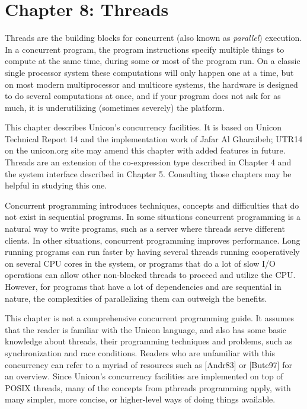 \clearpage\section{Chapter 8: Threads}

Threads are the building blocks for concurrent (also known as
{\em parallel\/}) execution. In a concurrent program,  the program
instructions specify multiple things to compute at the same time,
during some or most of the program run.  On a classic single processor
system these computations will only happen one at a time, but on most
modern multiprocessor and multicore systems, the hardware is designed
to do several computations at once, and if your program does not ask
for as much, it is underutilizing (sometimes severely) the platform.

This chapter describes Unicon's concurrency facilities. It is based
on Unicon Technical Report 14 and the implementation work of Jafar
Al Gharaibeh; UTR14 on the unicon.org site may amend this chapter
with added features in future.
Threads are an extension of the co-expression type described in
Chapter 4 and the system interface described in Chapter 5.
Consulting those chapters may be helpful in studying this one.

Concurrent programming introduces techniques, concepts and difficulties
that do not exist in sequential programs. In some situations concurrent
programming is a natural way to write programs, such as a server where
threads serve different clients. In other situations, concurrent
programming improves performance. Long running programs can run faster
by having several threads running cooperatively on several CPU cores in
the system, or programs that do a lot of slow I/O operations can allow
other non-blocked threads to proceed and utilize the CPU. However, for
programs that have a lot of dependencies and are sequential in nature,
the complexities of parallelizing them can outweigh the benefits.

This chapter is not a comprehensive concurrent programming guide. It
assumes that the reader is familiar with the Unicon language, and also
has some basic knowledge about threads, their programming techniques
and problems, such as synchronization and race conditions. Readers who are
unfamiliar with this concurrency can refer to a myriad of resources
such as [Andr83] or [Bute97] for an overview. Since Unicon{\textquoteright}s
concurrency facilities are implemented on top of POSIX threads, many of
the concepts from pthreads programming apply, with many simpler, more
concise, or higher-level ways of doing things available.

